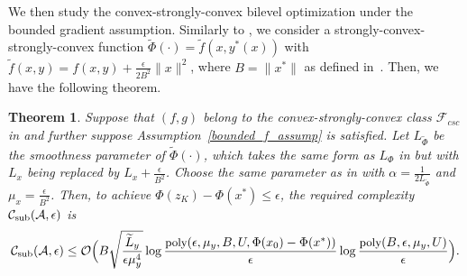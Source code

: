 \documentclass{osudissert96}
\DeclareMathOperator*{\argmin}{arg\,min}
\newtheorem{theorem}{Theorem}
\begin{document}


We then study the convex-strongly-convex bilevel optimization under the bounded gradient assumption. Similarly to , we consider a strongly-convex-strongly-convex function $\widetilde \Phi(\cdot)=\widetilde f(x,y^*(x))$  with $\widetilde f(x,y) = f(x,y) +\frac{\epsilon}{2B^2} \|x\|^2$, where $B=\|x^*\|$ as defined in~. %
Then, we have the following theorem. 
\begin{theorem}\label{convex_upper_BG}
Suppose that $(f,g)$ belong to the convex-strongly-convex class $\mathcal{F}_{csc}$ in  and further suppose Assumption~\ref{bounded_f_assump} is satisfied. Let $L_{\widetilde\Phi}$ be the smoothness parameter of $\widetilde\Phi(\cdot)$, which takes the same form as $L_\Phi$ in  but with $L_x$ being  replaced by  $L_x+ \frac{\epsilon}{B^2}$. 
Choose the same parameter as in  with $\alpha=\frac{1}{2L_{\widetilde \Phi}}$ and $\mu_x=\frac{\epsilon}{B^2}$. Then, to achieve $\Phi(z_K) - \Phi(x^*) \leq \epsilon$, the required complexity $\mathcal{C}_{\text{\normalfont sub}}(\mathcal{A},\epsilon)$ is 
\begin{align*}
\mathcal{C}_{\text{\normalfont sub}}(\mathcal{A},\epsilon)\leq \mathcal{O}\Big(B\sqrt{\frac{\widetilde L_y}{\epsilon\mu_y^4}}\log\frac{\mbox{\small \normalfont poly}(\epsilon,\mu_y,B,U,\Phi(x_{0})-\Phi(x^*))}{\epsilon}  \log \frac{\mbox{\small \normalfont poly}(B,\epsilon,\mu_y,U)}{\epsilon} \Big).
\end{align*}
\end{theorem}
\end{document}
